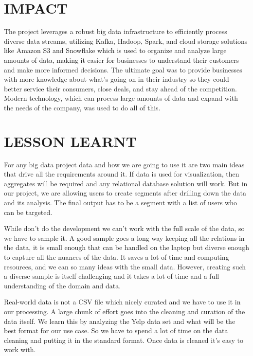\documentclass[conference]{IEEEtran}
\begin{document}



\section{IMPACT}
The project leverages a robust big data infrastructure to efficiently process diverse data streams, utilizing Kafka, Hadoop, Spark, and cloud storage solutions like Amazon S3 and Snowflake which is used to organize and analyze large amounts of data, making it easier for businesses to understand their customers and make more informed decisions. The ultimate goal was to provide businesses with more knowledge about what's going on in their industry so they could better service their consumers, close deals, and stay ahead of the competition. Modern technology, which can process large amounts of data and expand with the needs of the company, was used to do all of this.




\section{LESSON LEARNT}

For any big data project data and how we are going to use it are two main ideas that drive all the requirements around it. If data is used for visualization, then aggregates will be required and any relational database solution will work. But in our project, we are allowing users to create segments after drilling down the data and its analysis. The final output has to be a segment with a list of users who can be targeted. 

While don't do the development we can't work with the full scale of the data, so we have to sample it. A good sample goes a long way keeping all the relations in the data, it is small enough that can be handled on the laptop but diverse enough to capture all the nuances of the data. It saves a lot of time and computing resources, and we can so many ideas with the small data.  However, creating such a diverse sample is itself challenging and it takes a lot of time and a full understanding of the domain and data.

Real-world data is not a CSV file which nicely curated and we have to use it in our processing. A large chunk of effort goes into the cleaning and curation of the data itself. We learn this by analyzing the Yelp data set and what will be the best format for our use case. So we have to spend a lot of time on the data cleaning and putting it in the standard format. Once data is cleaned it's easy to work with.
\end{document}
